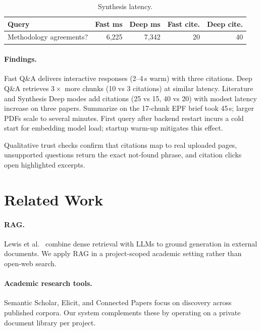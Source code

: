 \documentclass[sigplan,review,anonymous]{acmart}
\begin{document}
\begin{table}[t]
  \caption{Synthesis latency.}
  \label{tab:syn}
  \small
  \begin{tabular}{@{}lrrrr@{}}
    \toprule
    \textbf{Query} & \textbf{Fast ms} & \textbf{Deep ms} & \textbf{Fast cite.} & \textbf{Deep cite.} \\
    \midrule
    Methodology agreements? & 6{,}225 & 7{,}342 & 20 & 40 \\
    \bottomrule
  \end{tabular}
\end{table}

\paragraph{Findings.}
Fast Q\&A delivers interactive responses (2--4\,s warm) with three citations.
Deep Q\&A retrieves $3\times$ more chunks (10 vs 3 citations) at similar latency.
Literature and Synthesis Deep modes add citations (25 vs 15, 40 vs 20) with modest latency
increase on three papers.
Summarize on the 17-chunk EPF brief took 45\,s; larger PDFs scale to several minutes.
First query after backend restart incurs a cold start for embedding model load;
startup warm-up mitigates this effect.

Qualitative trust checks confirm that citations map to real uploaded pages, unsupported
questions return the exact not-found phrase, and citation clicks open highlighted excerpts.

\section{Related Work}
\label{sec:related}

\paragraph{RAG.}
Lewis et al.~\cite{lewis2020rag} combine dense retrieval with LLMs to ground generation in
external documents.
We apply RAG in a project-scoped academic setting rather than open-web search.

\paragraph{Academic research tools.}
Semantic Scholar, Elicit, and Connected Papers focus on discovery across published corpora.
Our system complements these by operating on a private document library per project.
\end{document}
